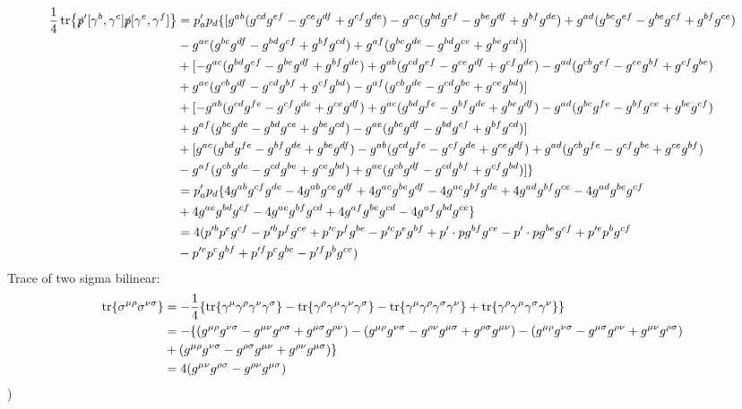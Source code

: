 \documentclass{article}
\newcommand{\gm}{\gamma^{\mu}} \newcommand{\gn}{\gamma^{\nu}}
\newcommand{\gs}{\gamma^{\sigma}} \newcommand{\gr}{\gamma^{\rho}}
\newcommand{\s}{\sigma} \renewcommand{\G}{\Gamma}
\renewcommand{\G}{\Gamma}
\begin{document}
\begin{align*}
  \frac{1}{4}\tr{\slashed p'[\gamma^b,\gamma^c]\slashed p[\gamma^e,\gamma^f]}
  &=p'_ap_d\{[g^{ab}(g^{cd}g^{ef}-g^{ce}g^{df}+g^{cf}g^{de})-g^{ac}(g^{bd}g^{ef}-g^{be}g^{df}+g^{bf}g^{de})+g^{ad}(g^{bc}g^{ef}-g^{be}g^{cf}+g^{bf}g^{ce})\\&-g^{ae}(g^{bc}g^{df}-g^{bd}g^{cf}+g^{bf}g^{cd})+g^{af}(g^{bc}g^{de}-g^{bd}g^{ce}+g^{be}g^{cd})]\\
  &+[-g^{ac}(g^{bd}g^{ef}-g^{be}g^{df}+g^{bf}g^{de})+g^{ab}(g^{cd}g^{ef}-g^{ce}g^{df}+g^{cf}g^{de})-g^{ad}(g^{cb}g^{ef}-g^{ce}g^{bf}+g^{cf}g^{be})\\&+g^{ae}(g^{cb}g^{df}-g^{cd}g^{bf}+g^{cf}g^{bd})-g^{af}(g^{cb}g^{de}-g^{cd}g^{be}+g^{ce}g^{bd})]\\
  &+[-g^{ab}(g^{cd}g^{fe}-g^{cf}g^{de}+g^{ce}g^{df})+g^{ac}(g^{bd}g^{fe}-g^{bf}g^{de}+g^{be}g^{df})-g^{ad}(g^{bc}g^{fe}-g^{bf}g^{ce}+g^{be}g^{cf})\\&+g^{af}(g^{bc}g^{de}-g^{bd}g^{ce}+g^{be}g^{cd})-g^{ae}(g^{bc}g^{df}-g^{bd}g^{cf}+g^{bf}g^{cd})]\\
  &+[g^{ac}(g^{bd}g^{fe}-g^{bf}g^{de}+g^{be}g^{df})-g^{ab}(g^{cd}g^{fe}-g^{cf}g^{de}+g^{ce}g^{df})+g^{ad}(g^{cb}g^{fe}-g^{cf}g^{be}+g^{ce}g^{bf})\\&-g^{af}(g^{cb}g^{de}-g^{cd}g^{be}+g^{ce}g^{bd})+g^{ae}(g^{cb}g^{df}-g^{cd}g^{bf}+g^{cf}g^{bd})]\}\\
  &=p'_ap_d\{4g^{ab}g^{cf}g^{de}-4g^{ab}g^{ce}g^{df}+4g^{ac}g^{be}g^{df}-4g^{ac}g^{bf}g^{de}+4g^{ad}g^{bf}g^{ce}-4g^{ad}g^{be}g^{cf}\\&+4g^{ae}g^{bd}g^{cf}-4g^{ae}g^{bf}g^{cd}+4g^{af}g^{be}g^{cd}-4g^{af}g^{bd}g^{ce}\}\\
  &=4(p'^bp^eg^{cf}-p'^bp^fg^{ce}+p'^cp^fg^{be}-p'^cp^eg^{bf}+p'\cdot pg^{bf}g^{ce}-p'\cdot pg^{be}g^{cf}+p'^ep^bg^{cf}\\&-p'^ep^cg^{bf}+p'^fp^cg^{be}-p'^fp^bg^{ce})
\end{align*}
Trace of two sigma bilinear:
\begin{align*}
  \tr{\s^{\mu\rho}\s^{\nu\s}}&=-\frac{1}{4}\{\tr{\gm\gr\gn\gs}-\tr{\gr\gm\gn\gs}-\tr{\gm\gr\gs\gn}+\tr{\gr\gm\gs\gn}\}\\
  &=-\{(g^{\mu\rho}g^{\nu\s}-g^{\mu\nu}g^{\rho\s}+g^{\mu\s}g^{\rho\nu})-(g^{\mu\rho}g^{\nu\s}-g^{\rho\nu}g^{\mu\s}+g^{\rho\s}g^{\mu\nu})-(g^{\mu\rho}g^{\nu\s}-g^{\mu\s}g^{\rho\nu}+g^{\mu\nu}g^{\rho\s})\\&+(g^{\mu\rho}g^{\nu\s}-g^{\rho\s}g^{\mu\nu}+g^{\rho\nu}g^{\mu\s})\}\\
  &=4(g^{\mu\nu}g^{\rho\s}-g^{\rho\nu}g^{\mu\s})
\end{align*}
)
\end{document}
